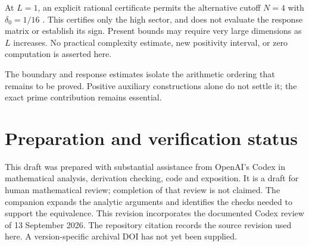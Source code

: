 At $L=1$, an explicit rational certificate permits the alternative cutoff
$N=4$ with $\delta_0=1/16$ \cite[Section 13]{Companion}.
This certifies only the high sector, and does not evaluate the response
matrix or establish its sign. Present bounds may require
very large dimensions as $L$ increases. No practical complexity estimate,
new positivity interval, or zero computation is asserted here.

The boundary and response estimates isolate the arithmetic ordering that
remains to be proved. Positive auxiliary constructions alone do not settle
it; the exact prime contribution remains essential.

\section*{Preparation and verification status}
This draft was prepared with substantial assistance from OpenAI's Codex in
mathematical analysis, derivation checking, code and exposition. It is a draft
for human mathematical review; completion of that review is not claimed.
The companion \cite{Companion} expands the analytic arguments and identifies
the checks needed to support the equivalence. This revision incorporates
the documented Codex review of 13 September 2026. The repository citation records the source
revision used here. A version-specific archival DOI has not yet been supplied.



